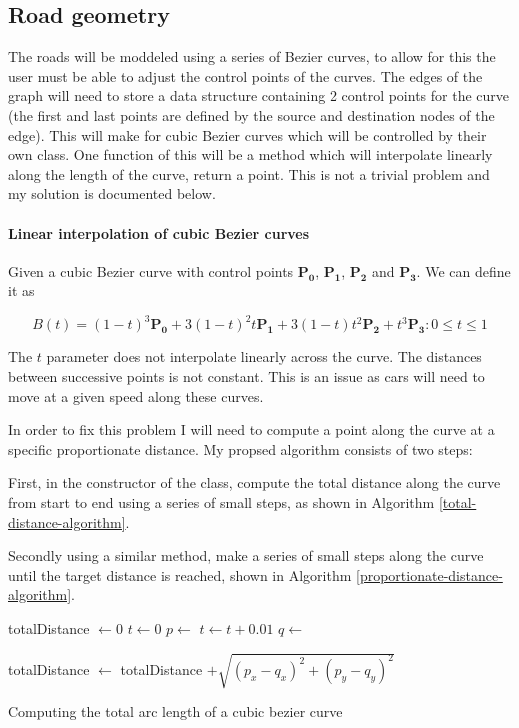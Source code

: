     \subsection{Road geometry}

    The roads will be moddeled using a series of Bezier curves, to allow for this the user must be able to adjust the control points of the curves. The edges of the graph will need to store a data structure containing 2 control points for the curve (the first and last points are defined by the source and destination nodes of the edge). This will make for cubic Bezier curves which will be controlled by their own  class. One function of this will be a  method which will interpolate linearly along the length of the curve, return a point. This is not a trivial problem and my solution is documented below.

    \paragraph{Linear interpolation of cubic Bezier curves}

    Given a cubic Bezier curve with control points $\mathbf{P_0}$, $\mathbf{P_1}$, $\mathbf{P_2}$ and $\mathbf{P_3}$. We can define it as

    \[B(t) = (1 - t)^3\mathbf{P_0} + 3(1 - t)^2t\mathbf{P_1} + 3(1 - t)t^2\mathbf{P_2} + t^3\mathbf{P_3} : 0 \leq t \leq 1\]

    The $t$ parameter does not interpolate linearly across the curve. The distances between successive points is not constant. This is an issue as cars will need to move at a given speed along these curves.

    In order to fix this problem I will need to compute a point along the curve at a specific proportionate distance. My propsed algorithm consists of two steps:

    First, in the constructor of the class, compute the total distance along the curve from start to end using a series of small steps, as shown in Algorithm \ref{total-distance-algorithm}.

    Secondly using a similar method, make a series of small steps along the curve until the target distance is reached, shown in Algorithm \ref{proportionate-distance-algorithm}.

    \begin{algorithm}
        \begin{algorithmic}
            \State totalDistance $\gets 0$
            \State $t \gets 0$
                \State $p \gets$ 
                \State $t \gets t + 0.01$
                \State $q \gets$ 

                \State totalDistance $\gets$ totalDistance $+ \sqrt{(p_x - q_x)^2 + (p_y - q_y)^2}$
            \EndWhile
        \end{algorithmic}
        \caption{Computing the total arc length of a cubic bezier curve}
        \label{total-distance-algorithm}
    \end{algorithm}

